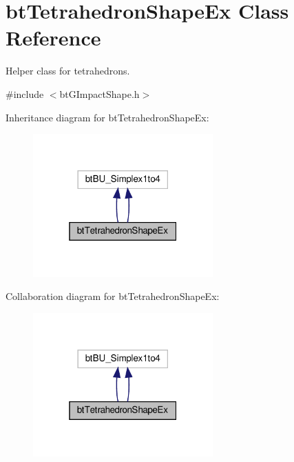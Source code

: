\hypertarget{classbtTetrahedronShapeEx}{}\section{bt\+Tetrahedron\+Shape\+Ex Class Reference}
\label{classbtTetrahedronShapeEx}


Helper class for tetrahedrons.  




{\ttfamily \#include $<$bt\+G\+Impact\+Shape.\+h$>$}



Inheritance diagram for bt\+Tetrahedron\+Shape\+Ex\+:
\nopagebreak
\begin{figure}[H]
\begin{center}
\leavevmode
\includegraphics[width=196pt]{classbtTetrahedronShapeEx__inherit__graph}
\end{center}
\end{figure}


Collaboration diagram for bt\+Tetrahedron\+Shape\+Ex\+:
\nopagebreak
\begin{figure}[H]
\begin{center}
\leavevmode
\includegraphics[width=196pt]{classbtTetrahedronShapeEx__coll__graph}
\end{center}
\end{figure}
